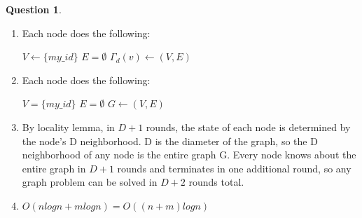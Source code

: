 \documentclass{amsart}
\theoremstyle{definition}
\newtheorem{question}{Question}
\begin{document}
\newpage
\begin{question}
  \begin{enumerate}[label={(\alph*)}]
  \item Each node does the following:
    \begin{algorithm}[h]
      \DontPrintSemicolon%
      $V \gets \{my\_id\}$\;
      $E = \emptyset$\;
      $\Gamma_d(v) \gets (V, E)$\;
    \end{algorithm}
    
  \item Each node does the following:
    \begin{algorithm}[h]
      \DontPrintSemicolon%
      $V = \{my\_id\}$\;
      $E = \emptyset$\;
      $G \gets (V, E)$\;
    \end{algorithm}
    
  \item By locality lemma, in $D+1$ rounds, the state of each node is determined by the node's D neighborhood. D is the diameter of the graph, so the D neighborhood of any node is the entire graph G. Every node knows about the entire graph in $D+1$ rounds and terminates in one additional round, so any graph problem can be solved in $D+2$ rounds total.
  \item $O(nlogn + mlogn) = O((n+m)logn)$
  \end{enumerate}
\end{question}
\end{document}
